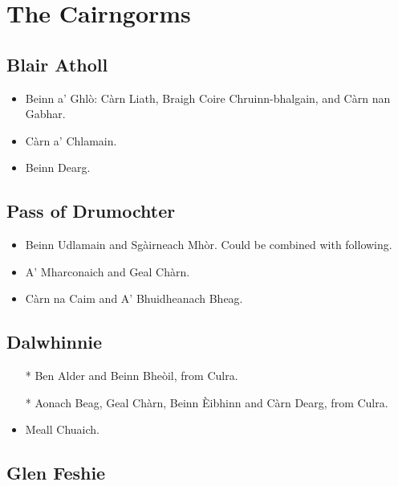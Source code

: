 \section{The Cairngorms}

\subsection{Blair Atholl}

\begin{itemize}
\item Beinn a' Ghlò: Càrn Liath, Braigh Coire Chruinn-bhalgain, and Càrn nan
  Gabhar.

\item Càrn a' Chlamain.

\item Beinn Dearg.
\end{itemize}


\subsection{Pass of Drumochter}

\begin{itemize}
\item
Beinn Udlamain and Sgàirneach Mhòr.  Could be combined with following.

\item
A' Mharconaich and Geal Chàrn.

\item Càrn na Caim and A' Bhuidheanach Bheag.
\end{itemize}


\subsection{Dalwhinnie}

\begin{itemize}
\item[*]
Ben Alder and Beinn Bheòil, from Culra.

\item[*]
Aonach Beag, Geal Chàrn, Beinn Èibhinn and Càrn Dearg, from Culra.

\item
Meall Chuaich.
\end{itemize}


\subsection{Glen Feshie}


